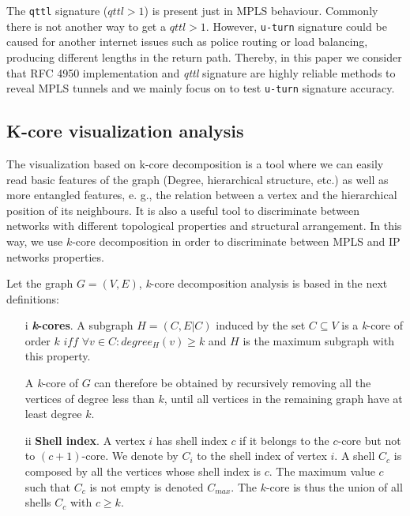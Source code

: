 The \texttt{qttl} signature ($qttl>1$) is present just in MPLS behaviour. Commonly there is not another way to get a $qttl>1$. However, \texttt{u-turn} signature could be caused for another internet issues such as police routing or load balancing, producing different lengths in the return path. Thereby, in this paper we consider that RFC 4950 implementation and \textit{qttl} signature are highly reliable methods to reveal MPLS tunnels and we mainly focus on to test \texttt{u-turn} signature accuracy.

\subsection{K-core visualization analysis}

The visualization based on {k}-core decomposition is a tool where we can easily read basic features of the graph (Degree, hierarchical structure, etc.) as well as more entangled features, e. g., the relation between a vertex and the hierarchical position of its neighbours. It is also a useful tool to  discriminate between networks with different topological properties and structural arrangement. In this way, we use $k$-core decomposition in order to discriminate between MPLS and IP networks properties. 

Let the graph $G=(V,E)$, \textit{k}-core decomposition analysis is based in the next definitions:

\begin{itemize}
\item[i]{\textbf{\textit{k}-cores}}. A subgraph $H=(C,E|C)$ induced by the set $ C\subseteq V$ is a \textit{k}-core of order $k$ $iff$ $\forall v \in C: degree_{H}(v)\geq k$ and $H$ is the maximum subgraph with this property.

A \textit{k}-core of $G$ can therefore be obtained by recursively removing all the vertices of degree less than $k$, until all vertices in the remaining graph have at least degree $k$. 

\item[ii]\textbf{Shell index}. A vertex $i$ has shell index $c$ if it belongs to the $c$-core but not to $(c+1)$-core. We denote by $C_i$ to the shell index of vertex $i$. A shell $C_c$ is composed by all the vertices whose shell index is $c$. The maximum value $c$ such that $C_c$ is not empty is denoted $C_{max}$. The $k$-core is thus the union of all shells $C_c$ with $c \geq k$.

\end{itemize}

